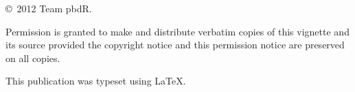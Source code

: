 
\null
\vfill
\copyright\ 2012 Team pbdR.

Permission is granted to make and distribute verbatim copies of
this vignette and its source provided the copyright notice and
this permission notice are preserved on all copies.

This publication was typeset using \LaTeX.

